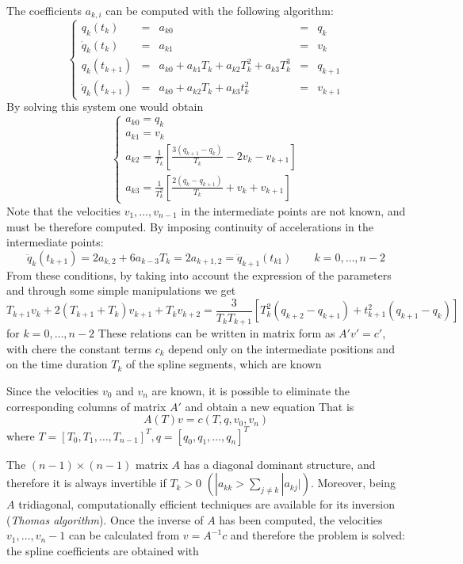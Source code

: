 \documentclass{book}
\begin{document}
The coefficients $a_{k,i}$ can be computed with the following algorithm: 
\[
    \left\{
        \begin{array}{lllll}
            q_k(t_k) & = & a_{k0}& = & q_k\\
            \dot{q}_k(t_k) & = & a_{k1}& = & v_k\\
            q_k(t_{k+1}) & = & a_{k0} + a_{k1}T_k + a_{k2} T_k^2 + a_{k3} T_k^3 & = & q_{k+1}\\
            \dot{q}_k(t_{k+1}) & = & a_{k0} + a_{k2} T_k + a_{k3}t_k^2 & = & v_{k+1}
        \end{array}
    \right.
\]
By solving this system one would obtain
\[
    \begin{cases}
        a_{k0} =  q_k\\
        a_{k1} =  v_k\\
        a_{k2} = \displaystyle\frac{1}{T_k}\left[\displaystyle\frac{3(q_{k+1}-q_k)}{T_k}-2v_k-v_{k+1}\right] \\
        a_{k3} = \displaystyle\frac{1}{T_k^2}\left[\displaystyle\frac{2(q_k-q_{k+1})}{T_k}+v_k+v_{k+1}\right] 
    \end{cases}
\]
Note that the velocities $v_1,\dots,v_{n-1}$ in the intermediate points are not known, and must be therefore computed. By imposing continuity of accelerations in the intermediate points: 
\[
    \ddot{q}_k(t_{k+1}) = 2a_{k,2}+6a_{k-3}T_k=2a_{k+1,2}=\ddot{q}_{k+1}(t_{k1}) \qquad k=0,\dots,n-2
\]
From these conditions, by taking into account the expression of the parameters and through some simple manipulations we get
\[
    T_{k+1}v_k+2(T_{k+1}+T_k)v_{k+1}+T_{k}v_{k+2} = \displaystyle\frac{3}{T_kT_{k+1}}[T_k^2(q_{k+2}-q_{k+1})+t_{k+1}^2(q_{k+1}-q_k)]
\]
for  $k=0,\dots,n-2$
These relations can be written in matrix form as $A'v'=c'$, with 
chere the constant terms $c_k$ depend only on the intermediate positions and on the time duration $T_k$ of the spline segments, which are known

Since the velocities $v_0$ and $v_n$ are known, it is possible to eliminate the corresponding columns of matrix $A'$ and obtain a new equation 
That is 
\[
  A(T)v=c(T,q,v_0,v_n)
\]
where $T=[T_0,T_1,\dots,T_{n-1}]^T,q=[q_0,q_1,\dots,q_n]^T$ 

The $(n-1)\times(n-1)$ matrix $A$ has a diagonal dominant structure, and therefore it is always invertible if $T_k>0$ $(|a_{kk}>\sum_{j\neq k}|a_{kj}|)$. 
Moreover, being $A$ tridiagonal, computationally efficient techniques are available for its inversion (\emph{Thomas algorithm}).
Once the inverse of $A$ has been computed, the velocities $v_1,\dots,v_n-1$ can be calculated from $v=A^{-1}c$ and therefore the problem is solved: the spline coefficients are obtained with %
\end{document}

